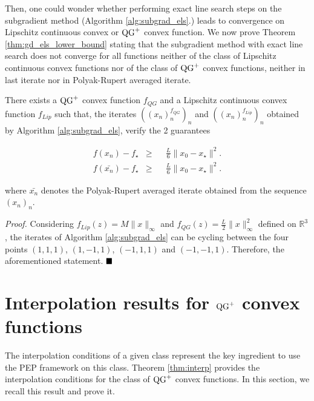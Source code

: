 Then, one could wonder whether performing exact line search steps on the subgradient method (Algorithm \ref{alg:subgrad_els}.) leads to convergence on Lipschitz continuous convex or $\operatorname{QG}^+$ convex function.
We now prove Theorem \ref{thm:gd_els_lower_bound} stating that the subgradient method with exact line search does not converge for all functions neither of the class of Lipschitz continuous convex functions nor of the class of $\operatorname{QG}^+$ convex functions, neither in last iterate nor in Polyak-Rupert averaged iterate.

\begin{Th}
    There exists a $\operatorname{QG}^+$ convex function $f_{QG}$ and a Lipschitz continuous convex function $f_{Lip}$ such that, the iterates $((x_n)_n^{f_{QG}})_n$ and $((x_n)_n^{f_{Lip}})_n$ obtained by Algorithm \ref{alg:subgrad_els}, verify the 2 guarantees
    
    \begin{align}
        f(x_n) - f_\star & \geq && \frac{L}{6} \|x_0 - x_\star\|^2. \\
        f(\bar{x_n}) - f_\star & \geq && \frac{L}{6} \|x_0 - x_\star\|^2.
    \end{align}
    
    where $\bar{x_n}$ denotes the Polyak-Rupert averaged iterate obtained from the sequence $(x_n)_n$.
    
    \label{thm:gd_els_lower_bound}
\end{Th}

\noindent \textit{Proof.}
    Considering $f_{Lip}(z) = M\|x\|_\infty$ and $f_{QG}(z) = \frac{L}{2}\|x\|_\infty^2$ defined on $\mathbb{R}^3$,
    the iterates of Algorithm \ref{alg:subgrad_els} can be cycling between the four points $(1,1,1)$, $(1,-1,1)$, $(-1,1,1)$ and $(-1,-1,1)$.
    Therefore, the aforementioned statement.
$\hfill\blacksquare$

\vspace{.5cm}

\section{\texorpdfstring{Interpolation results for $\operatorname{QG}^+$ convex functions}{Interpolation results for QG+ convex functions}}
\label{apx:interpolation_conditions}

The interpolation conditions of a given class represent the key ingredient to use the PEP framework on this class. Theorem \ref{thm:interp} provides the interpolation conditions for the class of $\operatorname{QG}^+$ convex functions. In this section, we recall this result and prove it.

